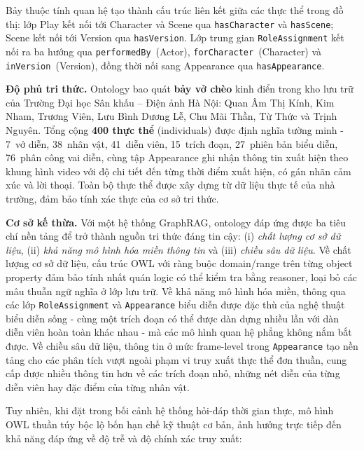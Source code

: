 Bảy thuộc tính quan hệ tạo thành cấu trúc liên kết giữa các thực thể trong đồ thị: lớp Play kết nối tới Character và Scene qua \texttt{hasCharacter} và \texttt{hasScene}; Scene kết nối tới Version qua \texttt{hasVersion}. Lớp trung gian \texttt{RoleAssignment} kết nối ra ba hướng qua \texttt{performedBy}~(Actor), \texttt{forCharacter}~(Character) và \texttt{inVersion}~(Version), đồng thời nối sang Appearance qua \texttt{hasAppearance}.

\textbf{Độ phủ tri thức.}
Ontology bao quát \textbf{bảy vở chèo} kinh điển trong kho lưu trữ của Trường Đại học Sân khấu – Điện ảnh Hà Nội: Quan Âm Thị Kính, Kim Nham, Trương Viên, Lưu Bình Dương Lễ, Chu Mãi Thần, Từ Thức và Trịnh Nguyên. Tổng cộng \textbf{400 thực thể} (individuals) được định nghĩa tường minh - 7~vở diễn, 38~nhân vật, 41~diễn viên, 15~trích đoạn, 27~phiên bản biểu diễn, 76~phân công vai diễn, cùng tập Appearance ghi nhận thông tin xuất hiện theo khung hình video với độ chi tiết đến từng thời điểm xuất hiện, có gán nhãn cảm xúc và lời thoại. Toàn bộ thực thể được xây dựng từ dữ liệu thực tế của nhà trường, đảm bảo tính xác thực của cơ sở tri thức.

\textbf{Cơ sở kế thừa.}
Với một hệ thống GraphRAG, ontology đáp ứng được ba tiêu chí nền tảng để trở thành nguồn tri thức đáng tin cậy: (i) \textit{chất lượng cơ sở dữ liệu}, (ii) \textit{khả năng mô hình hóa miền thông tin} và (iii) \textit{chiều sâu dữ liệu}. Về chất lượng cơ sở dữ liệu, cấu trúc OWL với ràng buộc domain/range trên từng object property đảm bảo tính nhất quán logic có thể kiểm tra bằng reasoner, loại bỏ các mâu thuẫn ngữ nghĩa ở lớp lưu trữ. Về khả năng mô hình hóa miền, thông qua các lớp \texttt{RoleAssignment} và \texttt{Appearance} biểu diễn được đặc thù của nghệ thuật biểu diễn sống - cùng một trích đoạn có thể được dàn dựng nhiều lần với dàn diễn viên hoàn toàn khác nhau - mà các mô hình quan hệ phẳng không nắm bắt được. Về chiều sâu dữ liệu, thông tin ở mức frame-level trong \texttt{Appearance} tạo nền tảng cho các phân tích vượt ngoài phạm vi truy xuất thực thể đơn thuần, cung cấp được nhiều thông tin hơn về các trích đoạn nhỏ, những nét diễn của từng diễn viên hay đặc điểm của từng nhân vật.

Tuy nhiên, khi đặt trong bối cảnh hệ thống hỏi-đáp thời gian thực, mô hình OWL thuần túy bộc lộ bốn hạn chế kỹ thuật cơ bản, ảnh hưởng trực tiếp đến khả năng đáp ứng về độ trễ và độ chính xác truy xuất:

